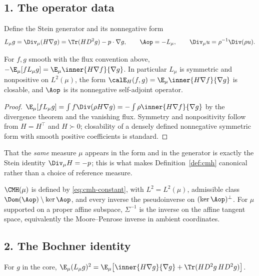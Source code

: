 \documentclass[../main.tex]{subfiles}
\begin{document}
\subsection*{1. The operator data}

Define the Stein generator and its nonnegative form
\[
  L_\mu g=\Div_\mu(H\nabla g)=\Tr(HD^2g)-p\cdot\nabla g,
  \qquad \Aop=-L_\mu,
  \qquad \Div_\mu u=\rho^{-1}\Div(\rho u).
\]

\begin{lemma}
\label{lem:sol-cmh-dirichlet}
For $f,g$ smooth with the flux convention above,
$-\E_\mu[fL_\mu g]=\E_\mu\inner{H\nabla f}{\nabla g}$. In particular $L_\mu$ is symmetric and
nonpositive on $L^2(\mu)$, the form $\calE_H(f,g)=\E_\mu\inner{H\nabla f}{\nabla g}$ is closable,
and $\Aop$ is its nonnegative self-adjoint operator.
\end{lemma}

\begin{proof}
$\E_\mu[fL_\mu g]=\int f\Div(\rho H\nabla g)=-\int\rho\inner{H\nabla f}{\nabla g}$ by the
divergence theorem and the vanishing flux. Symmetry and nonpositivity follow from $H=H^\top$
and $H\succ0$; closability of a densely defined nonnegative symmetric form with smooth positive
coefficients is standard.
\end{proof}

That the \emph{same} measure $\mu$ appears in the form and in the generator is exactly the Stein
identity $\Div_\mu H=-p$; this is what makes Definition~\ref{def:cmh} canonical rather than a
choice of reference measure.

\begin{definition}
$\CMH(\mu)$ is defined by \eqref{eq:cmh-constant}, with $L^2=L^2(\mu)$, admissible class
$\Dom(\Aop)\setminus\ker\Aop$, and every inverse the pseudoinverse on $(\ker\Aop)^\perp$. For
$\mu$ supported on a proper affine subspace, $\Sigma^{-1}$ is the inverse on the affine tangent
space, equivalently the Moore--Penrose inverse in ambient coordinates.
\end{definition}

\subsection*{2. The Bochner identity}

\begin{proposition}[= Proposition~\ref{prop:cmh-bochner}]
\label{prop:sol-cmh-bochner}
For $g$ in the core,
$\E_\mu(L_\mu g)^2=\E_\mu\bigl[\inner{H\nabla g}{\nabla g}+\Tr(HD^2g\,HD^2g)\bigr]$.
\end{proposition}
\end{document}
